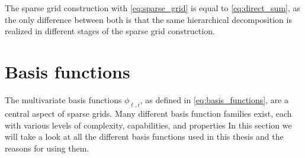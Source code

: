 \documentclass[
  a4paper,  %
  twoside,  %
  bibliography=totoc,
  headsepline,
  cleardoublepage=empty,
  parskip=half,
  draft=false
]{scrbook}
\begin{document}
The sparse grid construction with \cref{eq:sparse_grid} is equal to \cref{eq:direct_sum}, as the only difference between both is that the same hierarchical decomposition is realized in different stages of the sparse grid construction.


\section{Basis functions}

The multivariate basis functions $\phi_{\underline{\ell},\underline{i}}$, as defined in \cref{eq:basis_functions}, are a central aspect of sparse grids.
Many different basis function families exist, each with various levels of complexity, capabilities, and properties
In this section we will take a look at all the different basis functions used in this thesis and the reasons for using them.
\end{document}
